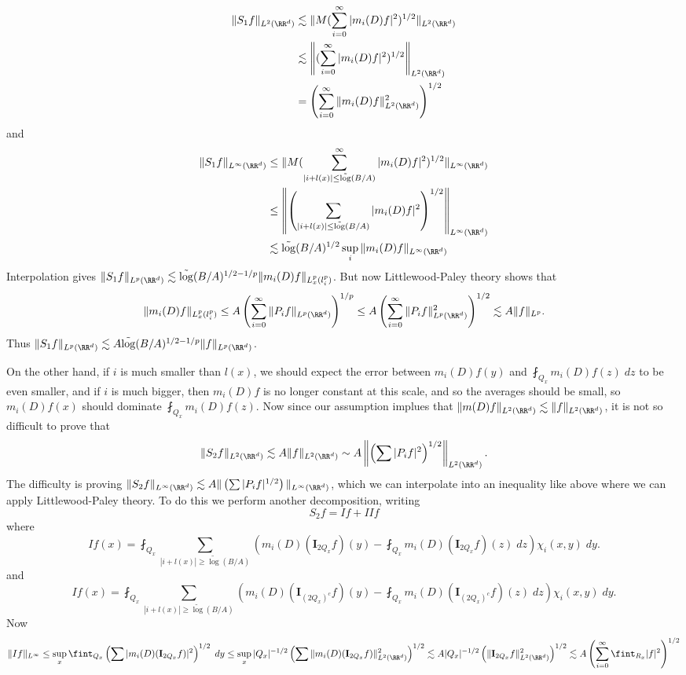 %
\begin{align*}
    \| S_1 f \|_{L^2(\RR^d)} &\lesssim \| M(\sum_{i = 0}^\infty |m_i(D) f|^2)^{1/2} \|_{L^2(\RR^d)}\\
    &\lesssim \left\| (\sum_{i = 0}^\infty |m_i(D) f|^2 )^{1/2} \right\|_{L^2(\RR^d)}\\
    &= \left( \sum_{i = 0}^\infty \| m_i(D) f \|_{L^2(\RR^d)}^2 \right)^{1/2}
\end{align*}
%
and
%
\begin{align*}
    \| S_1 f \|_{L^\infty(\RR^d)} &\leq \| M(\sum_{|i + l(x)| \leq \tilde{\log}(B/A)}^\infty |m_i(D) f|^2)^{1/2} \|_{L^\infty(\RR^d)}\\
    &\leq \left\| \left( \sum_{|i + l(x)| \leq \tilde{\log}(B/A)} |m_i(D) f|^2 \right)^{1/2} \right\|_{L^\infty(\RR^d)}\\
    &\lesssim \tilde{\log}(B/A)^{1/2} \sup_i  \| m_i(D) f \|_{L^\infty(\RR^d)}
\end{align*}
%
Interpolation gives $\| S_1 f \|_{L^p(\RR^d)} \lesssim \tilde{\log}(B/A)^{1/2 - 1/p} \| m_i(D) f \|_{L^p_x(l^p_i)}$. But now Littlewood-Paley theory shows that
%
\[ \| m_i(D) f \|_{L^p_x(l^p_i)} \leq A \left( \sum_{i = 0}^\infty \| P_i f \|_{L^p(\RR^d)} \right)^{1/p} \leq A \left( \sum_{i = 0}^\infty \| P_i f \|_{L^p(\RR^d)}^2 \right)^{1/2} \lesssim A \| f \|_{L^p}. \]
%
Thus $\| S_1 f \|_{L^p(\RR^d)} \lesssim A \tilde{\log}(B/A)^{1/2 - 1/p} \| f \|_{L^p(\RR^d)}$.

On the other hand, if $i$ is much smaller than $l(x)$, we should expect the error between $m_i(D) f(y)$ and $\fint_{Q_x} m_i(D) f(z)\; dz$ to be even smaller, and if $i$ is much bigger, then $m_i(D) f$ is no longer constant at this scale, and so the averages should be small, so $m_i(D) f(x)$ should dominate $\fint_{Q_x} m_i(D) f(z)$. Now since our assumption implues that $\| m(D) f \|_{L^2(\RR^d)} \lesssim \| f \|_{L^2(\RR^d)}$, it is not so difficult to prove that
%
\[ \| S_2 f \|_{L^2(\RR^d)} \lesssim A \| f \|_{L^2(\RR^d)} \sim A \left\| \left( \sum |P_i f|^2 \right)^{1/2} \right\|_{L^2(\RR^d)}. \]
%
The difficulty is proving $\| S_2 f \|_{L^\infty(\RR^d)} \lesssim A \| \left( \sum |P_i f|^{1/2} \right) \|_{L^\infty(\RR^d)}$, which we can interpolate into an inequality like above where we can apply Littlewood-Paley theory. To do this we perform another decomposition, writing
%
\[ S_2 f = I f + {II}f \]
%
where
%
\[ If(x) = \fint_{Q_x} \sum_{|i + l(x)| \geq \tilde\log(B/A)} \left( m_i(D) (\mathbf{I}_{2Q_x}f)(y) - \fint_{Q_x} m_i(D)(\mathbf{I}_{2Q_x} f)(z)\; dz \right) \chi_i(x,y)\; dy. \]
%
and
%
\[ If(x) = \fint_{Q_x} \sum_{|i + l(x)| \geq \tilde\log(B/A)} \left( m_i(D) (\mathbf{I}_{(2Q_x)^c}f)(y) - \fint_{Q_x} m_i(D)(\mathbf{I}_{(2Q_x)^c} f)(z)\; dz \right) \chi_i(x,y)\; dy. \]
%
Now
%
\[ \|If \|_{L^\infty} \leq \sup_x \fint_{Q_x} \left( \sum | m_i(D) (\mathbf{I}_{2Q_x} f) |^2 \right)^{1/2}\; dy \leq \sup_x |Q_x|^{-1/2} \left( \sum \| m_i(D) (\mathbf{I}_{2Q_x} f) \|_{L^2(\RR^d)}^2 \right)^{1/2} \lesssim A |Q_x|^{-1/2} \left( \| \mathbf{I}_{2Q_x} f \|_{L^2(\RR^d)}^2 \right)^{1/2} \lesssim A \left( \sum_{i = 0}^\infty \fint_{R_x} |f|^2 \right)^{1/2} \]


